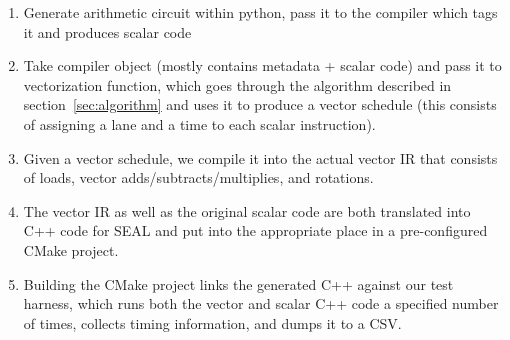 \begin{enumerate}
    \item Generate arithmetic circuit within python, pass it to the compiler which tags it and produces scalar code
    \item Take compiler object (mostly contains metadata + scalar code) and pass it to vectorization function, which goes through the algorithm described in section~\ref{sec:algorithm} and uses it to produce a vector schedule (this consists of assigning a lane and a time to each scalar instruction).
    \item Given a vector schedule, we compile it into the actual vector IR that consists of loads, vector adds/subtracts/multiplies, and rotations.
    \item The vector IR as well as the original scalar code are both translated into C++ code for SEAL and put into the appropriate place in a pre-configured CMake project.
    \item Building the CMake project links the generated C++ against our test harness, which runs both the vector and scalar C++ code a specified number of times, collects timing information, and dumps it to a CSV.
\end{enumerate}
